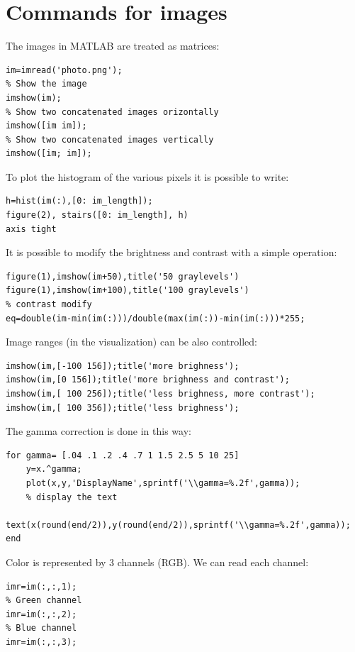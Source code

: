\documentclass[12pt, a4paper]{report}
\newtheorem[style=M,bodystyle=\normalfont]{theorem}{Theorem}
\newtheorem[style=M,bodystyle=\normalfont]{corollary}{Corollary}
\newtheorem[style=M,bodystyle=\normalfont]{lemma}{Lemma}
\newtheorem[style=M,bodystyle=\normalfont]{definition}{Definition}
\begin{document}
    \section{Commands for images}
    The images in MATLAB are treated as matrices:
    \begin{lstlisting}[frame=single, numbers=none, style=Matlab-bw]
im=imread('photo.png');
% Show the image
imshow(im);
% Show two concatenated images orizontally
imshow([im im]);
% Show two concatenated images vertically
imshow([im; im]);
    \end{lstlisting}
    To plot the histogram of the various pixels it is possible to write: 
    \begin{lstlisting}[frame=single, numbers=none, style=Matlab-bw]
h=hist(im(:),[0: im_length]);
figure(2), stairs([0: im_length], h)
axis tight
    \end{lstlisting}
    It is possible to modify the brightness and contrast with a simple operation:
    \begin{lstlisting}[frame=single, numbers=none, style=Matlab-bw]
figure(1),imshow(im+50),title('50 graylevels')
figure(1),imshow(im+100),title('100 graylevels')
% contrast modify
eq=double(im-min(im(:)))/double(max(im(:))-min(im(:)))*255;
    \end{lstlisting}
    Image ranges (in the visualization) can be also controlled:
    \begin{lstlisting}[frame=single, numbers=none, style=Matlab-bw]
imshow(im,[-100 156]);title('more brighness');
imshow(im,[0 156]);title('more brighness and contrast');
imshow(im,[ 100 256]);title('less brighness, more contrast');
imshow(im,[ 100 356]);title('less brighness');
    \end{lstlisting}
    The gamma correction is done in this way: 
    \begin{lstlisting}[frame=single, numbers=none, style=Matlab-bw]
for gamma= [.04 .1 .2 .4 .7 1 1.5 2.5 5 10 25]
    y=x.^gamma;
    plot(x,y,'DisplayName',sprintf('\\gamma=%.2f',gamma));
    % display the text
    text(x(round(end/2)),y(round(end/2)),sprintf('\\gamma=%.2f',gamma));
end
    \end{lstlisting}
    Color is represented by 3 channels (RGB). We can read each channel:
    \begin{lstlisting}[frame=single, numbers=none, style=Matlab-bw]
% Red channel
imr=im(:,:,1);
% Green channel
imr=im(:,:,2);
% Blue channel
imr=im(:,:,3);
    \end{lstlisting}
\end{document}
